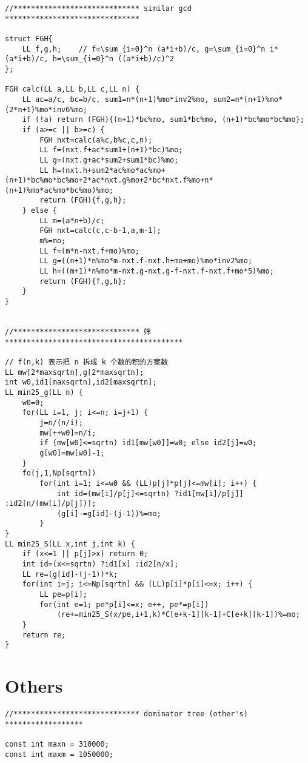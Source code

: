 \documentclass{article}
\begin{document}
\begin{multicols}{2}
\begin{lstlisting}
//***************************** similar gcd *******************************

struct FGH{
    LL f,g,h;    // f=\sum_{i=0}^n (a*i+b)/c, g=\sum_{i=0}^n i*(a*i+b)/c, h=\sum_{i=0}^n ((a*i+b)/c)^2
};

FGH calc(LL a,LL b,LL c,LL n) {
    LL ac=a/c, bc=b/c, sum1=n*(n+1)%mo*inv2%mo, sum2=n*(n+1)%mo*(2*n+1)%mo*inv6%mo;
    if (!a) return (FGH){(n+1)*bc%mo, sum1*bc%mo, (n+1)*bc%mo*bc%mo};
    if (a>=c || b>=c) {
        FGH nxt=calc(a%c,b%c,c,n);
        LL f=(nxt.f+ac*sum1+(n+1)*bc)%mo;
        LL g=(nxt.g+ac*sum2+sum1*bc)%mo;
        LL h=(nxt.h+sum2*ac%mo*ac%mo+(n+1)*bc%mo*bc%mo+2*ac*nxt.g%mo+2*bc*nxt.f%mo+n*(n+1)%mo*ac%mo*bc%mo)%mo;
        return (FGH){f,g,h};
    } else {
        LL m=(a*n+b)/c;
        FGH nxt=calc(c,c-b-1,a,m-1);
        m%=mo;
        LL f=(m*n-nxt.f+mo)%mo;
        LL g=((n+1)*n%mo*m-nxt.f-nxt.h+mo+mo)%mo*inv2%mo;
        LL h=((m+1)*n%mo*m-nxt.g-nxt.g-f-nxt.f-nxt.f+mo*5)%mo;
        return (FGH){f,g,h};
    }
}


//***************************** 筛 *****************************************

// f(n,k) 表示把 n 拆成 k 个数的积的方案数
LL mw[2*maxsqrtn],g[2*maxsqrtn];
int w0,id1[maxsqrtn],id2[maxsqrtn];
LL min25_g(LL n) {
    w0=0;
    for(LL i=1, j; i<=n; i=j+1) {
        j=n/(n/i);
        mw[++w0]=n/i;
        if (mw[w0]<=sqrtn) id1[mw[w0]]=w0; else id2[j]=w0;
        g[w0]=mw[w0]-1;
    }
    fo(j,1,Np[sqrtn])
        for(int i=1; i<=w0 && (LL)p[j]*p[j]<=mw[i]; i++) {
            int id=(mw[i]/p[j]<=sqrtn) ?id1[mw[i]/p[j]] :id2[n/(mw[i]/p[j])];
            (g[i]-=g[id]-(j-1))%=mo;
        }
}
LL min25_S(LL x,int j,int k) {
    if (x<=1 || p[j]>x) return 0;
    int id=(x<=sqrtn) ?id1[x] :id2[n/x];
    LL re=(g[id]-(j-1))*k;
    for(int i=j; i<=Np[sqrtn] && (LL)p[i]*p[i]<=x; i++) {
        LL pe=p[i];
        for(int e=1; pe*p[i]<=x; e++, pe*=p[i])
            (re+=min25_S(x/pe,i+1,k)*C[e+k-1][k-1]+C[e+k][k-1])%=mo;
    }
    return re;
}
\end{lstlisting}

  \section{Others}

  \begin{lstlisting}
//***************************** dominator tree (other's) ******************

const int maxn = 310000;
const int maxm = 1050000;


\end{lstlisting}
\end{multicols}
\end{document}
